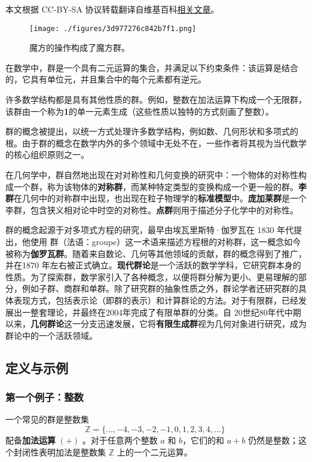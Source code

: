 
本文根据 CC-BY-SA 协议转载翻译自维基百科\href{https://en.wikipedia.org/wiki/Group_(mathematics)}{相关文章}。

\begin{figure}[ht]
\centering
\texttt{[image: ./figures/3d977276c842b7f1.png]}
\caption{魔方的操作构成了魔方群。} \label{fig_GroupM_1}
\end{figure}
在数学中，群是一个具有二元运算的集合，并满足以下约束条件：该运算是结合的，它具有单位元，并且集合中的每个元素都有逆元。  

许多数学结构都是具有其他性质的群。例如，整数在加法运算下构成一个无限群，该群由一个称为\textbf{1}的单一元素生成（这些性质以独特的方式刻画了整数）。

群的概念被提出，以统一方式处理许多数学结构，例如数、几何形状和多项式的根。由于群的概念在数学内外的多个领域中无处不在，一些作者将其视为当代数学的核心组织原则之一。  

在几何学中，群自然地出现在对对称性和几何变换的研究中：一个物体的对称性构成一个群，称为该物体的\textbf{对称群}，而某种特定类型的变换构成一个更一般的群。\textbf{李群}在几何中的对称群中出现，也出现在粒子物理学的\textbf{标准模型}中。\textbf{庞加莱群}是一个李群，包含狭义相对论中时空的对称性。\textbf{点群}则用于描述分子化学中的对称性。

群的概念起源于对多项式方程的研究，最早由埃瓦里斯特·伽罗瓦在 1830 年代提出，他使用 群（法语：groupe）这一术语来描述方程根的对称群，这一概念如今被称为\textbf{伽罗瓦群}。随着来自数论、几何等其他领域的贡献，群的概念得到了推广，并在1870 年左右被正式确立。\textbf{现代群论}是一个活跃的数学学科，它研究群本身的性质。为了探索群，数学家引入了各种概念，以便将群分解为更小、更易理解的部分，例如子群、商群和单群。除了研究群的抽象性质之外，群论学者还研究群的具体表现方式，包括表示论（即群的表示）和计算群论的方法。对于有限群，已经发展出一整套理论，并最终在2004年完成了有限单群的分类。自 20世纪80年代中期以来，\textbf{几何群论}这一分支迅速发展，它将\textbf{有限生成群}视为几何对象进行研究，成为群论中的一个活跃领域。
\subsection{定义与示例}  
\subsubsection{第一个例子：整数}
一个常见的群是整数集
\[
\mathbb{Z} = \{\ldots, -4, -3, -2, -1, 0, 1, 2, 3, 4, \ldots\}~
\]
配备\textbf{加法运算} \((+)\) 。对于任意两个整数 \(a\) 和 \(b\)，它们的和 \(a + b\) 仍然是整数；这个封闭性表明加法是整数集 \(\mathbb{Z}\) 上的一个二元运算。  

